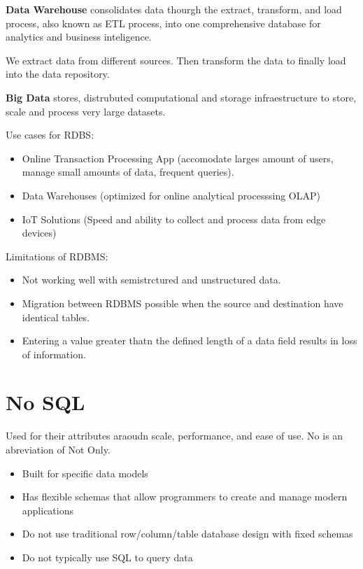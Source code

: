 \documentclass[../../ibm_data_analysis.tex]{subfiles}
\begin{document}
    \begin{mydef}
        \textbf{Data Warehouse} consolidates data thourgh the extract, transform, and load process, also known as ETL process, into one comprehensive database for analytics and business inteligence.
    \end{mydef}

    We extract data from different sources. Then transform the data to finally load into the data repository.

    \begin{mydef}
        \textbf{Big Data} stores, distrubuted computational and storage infraestructure to store, scale and process very large datasets.
    \end{mydef}

    \begin{obs}
        Use cases for RDBS:
        \begin{itemize}
            \item Online Transaction Processing App (accomodate larges amount of users, manage small amounts of data, frequent queries).
            \item Data Warehouses (optimized for online analytical processsing OLAP)
            \item IoT Solutions (Speed and ability to collect and process data from edge devices) 
        \end{itemize}
    \end{obs}

    \begin{obs}
        Limitations of RDBMS:
        \begin{itemize}
            \item Not working well with semistrctured and unstructured data.
            \item Migration between RDBMS possible when the source and destination have identical tables.
            \item Entering a value greater thatn the defined length of a data field results in loss of information.
        \end{itemize}
    \end{obs}

    \section{No SQL}

    Used for their attributes araoudn scale, performance, and ease of use. No is an abreviation of Not Only. 
    \begin{itemize}
        \item Built for specific data models
        \item Has flexible schemas that allow programmers to create and manage modern applications
        \item Do not use traditional row/column/table database design with fixed schemas
        \item Do not typically use SQL to query data
    \end{itemize}
\end{document}
